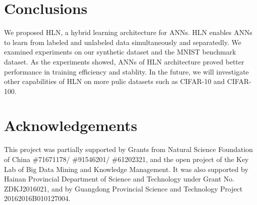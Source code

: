 \documentclass[3p,times,procedia]{elsarticle}
\begin{document}
\section{Conclusions}
We proposed HLN, a hybrid learning 
architecture for ANNs.
HLN enables ANNs to learn from
labeled and unlabeled data 
simultaneously and separatedly.
We examined experiments on our
synthetic dataset and the MNIST 
benchmark dataset.
As the experiments showed,
ANNs of HLN architecture 
proved better performance in
training efficiency and stablity.
In the future, we will investigate
other capabilities of HLN on more
pulic datasets such as CIFAR-10 and
CIFAR-100.

\section*{Acknowledgements}
This project was partially supported 
by Grants from Natural Science 
Foundation of China
\#71671178/ \#91546201/ \#61202321, 
and the open project of the Key Lab 
of Big Data Mining and
Knowledge Management. 
It was also supported by Hainan 
Provincial Department of Science 
and Technology under Grant 
No. ZDKJ2016021, and by 
Guangdong Provincial Science and
Technology Project 
20162016B010127004.






\end{document}

